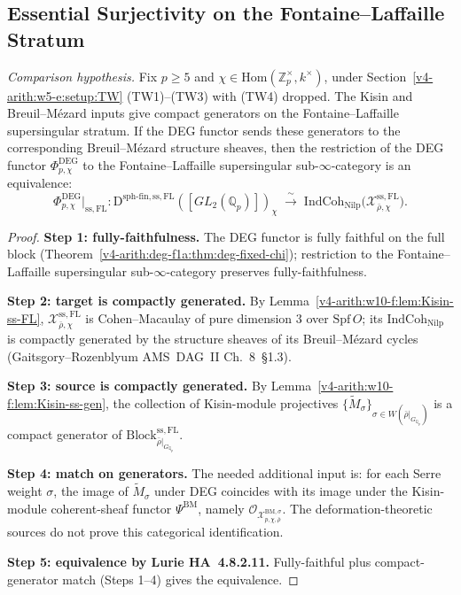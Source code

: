 \subsection{Essential Surjectivity on the Fontaine--Laffaille Stratum}
\label{v4-arith:w10-f:ss-essential}

\begin{theorem}
\label{v4-arith:w10-f:thm:f1a1-ss-FL}
\emph{Comparison hypothesis.} Fix \(p\geq 5\) and
\(\chi\in\mathrm{Hom}(\mathbb{Z}_{p}^{\times},k^{\times})\), under
Section~\ref{v4-arith:w5-e:setup:TW} (TW1)--(TW3) with (TW4) dropped. The
Kisin and Breuil--M{\'e}zard inputs give compact generators on the
Fontaine--Laffaille supersingular stratum. If the DEG functor sends
these generators to the corresponding Breuil--M{\'e}zard structure
sheaves, then the
restriction of the DEG functor
\(\Phi^{\mathrm{DEG}}_{p,\chi}\) to the Fontaine--Laffaille supersingular
sub-\(\infty\)-category is an equivalence:
\[
\Phi^{\mathrm{DEG}}_{p,\chi}\big|_{\mathrm{ss,FL}}\colon
\mathrm{D}^{\mathrm{sph\text{-}fin,ss,FL}}([GL_{2}(\mathbb{Q}_{p})])_{\chi}
\;\xrightarrow{\;\sim\;}\;
\mathrm{IndCoh}_{\mathrm{Nilp}}\bigl(\mathcal{X}^{\mathrm{ss,FL}}_{\bar\rho,\chi}\bigr).
\]
\end{theorem}

\begin{proof}
\textbf{Step 1: fully-faithfulness.} The DEG functor is fully faithful
on the full block (Theorem~\ref{v4-arith:deg-f1a:thm:deg-fixed-chi});
restriction to the Fontaine--Laffaille supersingular sub-\(\infty\)-category
preserves fully-faithfulness.

\textbf{Step 2: target is compactly generated.} By
Lemma~\ref{v4-arith:w10-f:lem:Kisin-ss-FL},
\(\mathcal{X}^{\mathrm{ss,FL}}_{\bar\rho,\chi}\) is Cohen--Macaulay of
pure dimension \(3\) over \(\mathrm{Spf}\,O\); its
\(\mathrm{IndCoh}_{\mathrm{Nilp}}\) is compactly generated by the
structure sheaves of its Breuil--M{\'e}zard cycles
(Gaitsgory--Rozenblyum AMS~DAG~II Ch.~8~\S 1.3).

\textbf{Step 3: source is compactly generated.} By
Lemma~\ref{v4-arith:w10-f:lem:Kisin-ss-gen}, the collection of
Kisin-module projectives
\(\{\widetilde{M}_{\sigma}\}_{\sigma\in W(\bar\rho|_{G_{\mathbb{Q}_{p}}})}\)
is a compact generator of
\(\mathrm{Block}^{\mathrm{ss,FL}}_{\bar\rho|_{G_{\mathbb{Q}_{p}}}}\).

\textbf{Step 4: match on generators.} The needed additional input is:
for each Serre weight \(\sigma\), the image of
\(\widetilde{M}_{\sigma}\) under DEG coincides with its image under the
Kisin-module coherent-sheaf functor \(\Psi^{\mathrm{BM}}\), namely
\(\mathcal{O}_{\mathcal{X}^{\mathrm{BM},\sigma}_{p,\chi,\bar\rho}}\). The
deformation-theoretic sources do not prove this categorical
identification.

\textbf{Step 5: equivalence by Lurie HA~4.8.2.11.} Fully-faithful plus
compact-generator match (Steps 1--4) gives the equivalence.
\end{proof}

